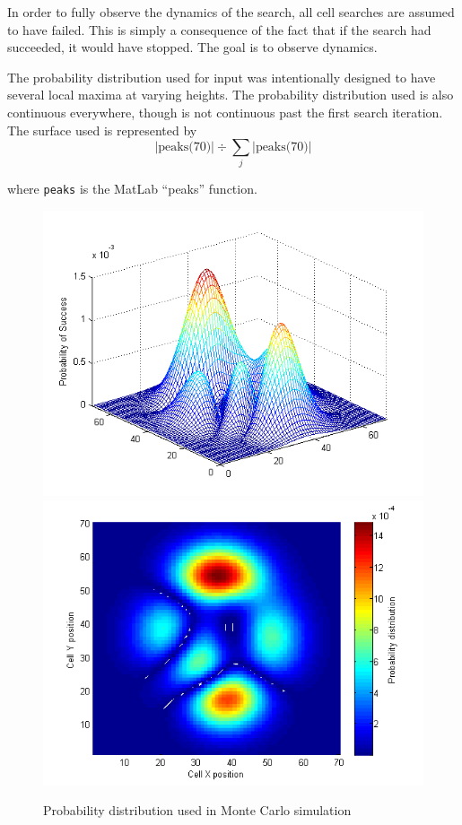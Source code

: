 \documentclass[a4paper]{article}
\begin{document}
In order to fully observe the dynamics of the search, all cell searches are assumed to have failed. This is simply a consequence of the fact that if the search had succeeded, it would have stopped. The goal is to observe dynamics.

The probability distribution used for input was intentionally designed to have several local maxima at varying heights. The probability distribution used is also continuous everywhere, though is not continuous past the first search iteration. The surface used is represented by $$|\mbox{peaks(70)}|\div \sum_j |\text{peaks(70)}|$$

where \texttt{peaks} is the MatLab ``peaks'' function.

\begin{figure}[H]\begin{center}
\includegraphics[scale=0.5]{../Matlab/Images/InitialProbDist.png}
\includegraphics[scale=0.5]{../Matlab/Images/InitialProbDistSurf.png}
\caption{Probability distribution used in Monte Carlo simulation}
\end{center}\end{figure}
\end{document}
